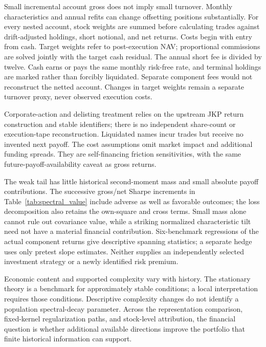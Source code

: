 Small incremental account gross does not imply small turnover. Monthly
characteristics and annual refits can change offsetting positions substantially.
For every nested account, stock weights are summed before calculating trades
against drift-adjusted holdings, short notional, and net returns. Costs begin
with entry from cash. Target weights refer to post-execution NAV; proportional
commissions are solved jointly with the target cash residual. The annual
short fee is divided by twelve. Cash earns or pays the same monthly risk-free
rate, and terminal holdings are marked rather than forcibly liquidated.
Separate component fees would not reconstruct the netted account. Changes in
target weights remain a separate turnover proxy, never observed execution costs.

Corporate-action and delisting treatment relies on the upstream JKP return
construction and stable identifiers; there is no independent share-count or
execution-tape reconstruction. Liquidated names incur trades but receive no
invented next payoff. The cost assumptions omit market impact and additional
funding spreads. They are self-financing friction sensitivities, with the
same future-payoff-availability caveat as gross returns.

The weak tail has little historical second-moment mass and small absolute
payoff contributions. The successive gross/net Sharpe increments in
Table~\ref{tab:spectral_value} include adverse as well as favorable outcomes;
the loss decomposition also retains the own-square and cross terms. Small
mass alone cannot rule out covariance value, while a striking normalized
characteristic tilt need not have a material financial contribution.
Six-benchmark regressions of the actual component returns give descriptive
spanning statistics; a separate hedge uses only pretest slope estimates.
Neither supplies an independently selected investment strategy or a newly
identified risk premium.

Economic content and supported complexity vary with history. The stationary
theory is a benchmark for approximately stable conditions; a local
interpretation requires those conditions. Descriptive complexity changes do
not identify a population spectral-decay parameter. Across the representation
comparison, fixed-kernel regularization paths, and stock-level attribution,
the financial question is whether additional available directions improve
the portfolio that finite historical information can support.
